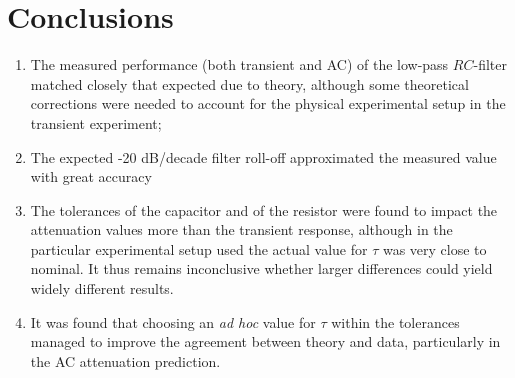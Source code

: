 \documentclass{article}
\begin{document}
\section{Conclusions}
\begin{enumerate}
    \item The measured performance (both transient and AC) of the low-pass $RC$-filter matched closely that expected due to theory, although some theoretical corrections were needed to account for the physical experimental setup in the transient experiment;
    \item The expected -20 dB/decade filter roll-off approximated the measured value with great accuracy
    \item The tolerances of the capacitor and of the resistor were found to impact the attenuation values more than the transient response, although in the particular experimental setup used the actual value for $\tau$ was very close to nominal. It thus remains inconclusive whether larger differences could yield widely different results.
    \item It was found that choosing an \textit{ad hoc} value for $\tau$ within the tolerances managed to improve the agreement between theory and data, particularly in the AC attenuation prediction.
\end{enumerate}
\end{document}
